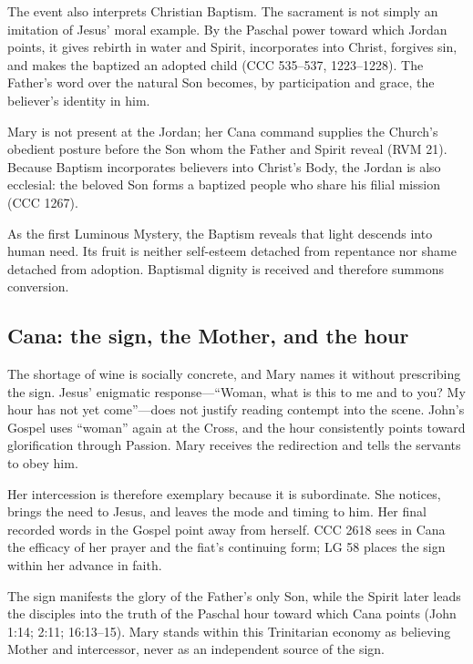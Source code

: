 The event also interprets Christian Baptism. The sacrament is not simply an imitation of Jesus' moral example. By the Paschal power toward which Jordan points, it gives rebirth in water and Spirit, incorporates into Christ, forgives sin, and makes the baptized an adopted child (CCC 535--537, 1223--1228). The Father's word over the natural Son becomes, by participation and grace, the believer's identity in him.

Mary is not present at the Jordan; her Cana command supplies the Church's obedient posture before the Son whom the Father and Spirit reveal (RVM 21). Because Baptism incorporates believers into Christ's Body, the Jordan is also ecclesial: the beloved Son forms a baptized people who share his filial mission (CCC 1267).

As the first Luminous Mystery, the Baptism reveals that light descends into human need. Its fruit is neither self-esteem detached from repentance nor shame detached from adoption. Baptismal dignity is received and therefore summons conversion.

\subsection{Cana: the sign, the Mother, and the hour}


The shortage of wine is socially concrete, and Mary names it without prescribing the sign. Jesus' enigmatic response---``Woman, what is this to me and to you? My hour has not yet come''---does not justify reading contempt into the scene. John's Gospel uses ``woman'' again at the Cross, and the hour consistently points toward glorification through Passion. Mary receives the redirection and tells the servants to obey him.

Her intercession is therefore exemplary because it is subordinate. She notices, brings the need to Jesus, and leaves the mode and timing to him. Her final recorded words in the Gospel point away from herself. CCC 2618 sees in Cana the efficacy of her prayer and the fiat's continuing form; LG 58 places the sign within her advance in faith.

The sign manifests the glory of the Father's only Son, while the Spirit later leads the disciples into the truth of the Paschal hour toward which Cana points (John 1:14; 2:11; 16:13--15). Mary stands within this Trinitarian economy as believing Mother and intercessor, never as an independent source of the sign.

